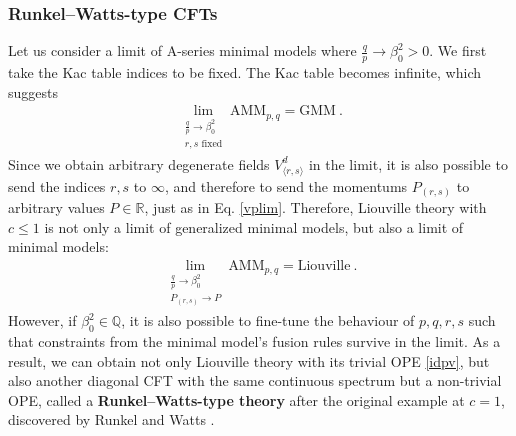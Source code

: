 \documentclass[12pt, a4paper]{article}
\newcommand{\myindex}[1]{\textbf{\boldmath #1}}
\theoremstyle{break}
\begin{document}
\subsubsection{Runkel--Watts-type CFTs}\label{sec:rwt}

Let us consider a limit of A-series minimal models where $\frac{q}{p}\to \beta_0^2>0$. We first take the Kac table indices to be fixed. 
The Kac table becomes infinite, which suggests 
\begin{align}
 \lim_{\substack{\frac{q}{p}\to \beta_0^2\\ r,s\text{ fixed}}} \text{AMM}_{p,q} = \text{GMM}\ . 
 \label{mm-gmm}
\end{align}
Since we obtain arbitrary degenerate fields $V^d_{\langle r,s\rangle}$ in the limit, it is also possible to send the indices $r,s$ to $\infty$, and therefore to send the momentums $P_{(r,s)}$ to arbitrary values $P\in\mathbb{R}$, just as in Eq. \eqref{vplim}. Therefore, Liouville theory with $c\leq 1$ is not only a limit of generalized minimal models, but also a limit of minimal models:
\begin{align}
 \lim_{\substack{\frac{q}{p}\to \beta_0^2\\ P_{(r,s)}\to P}} \text{AMM}_{p,q} = \text{Liouville}\ . 
 \label{mm-liou}
\end{align}
However, if $\beta_0^2\in\mathbb{Q}$, it is also possible to fine-tune the behaviour of $p,q,r,s$ such that constraints from the minimal model's fusion rules survive in the limit. As a result, we can obtain not only Liouville theory with its trivial OPE \eqref{idpv}, but also another diagonal CFT with the same continuous spectrum but a non-trivial OPE, called a \myindex{Runkel--Watts-type theory} after the original example at $c=1$, discovered by Runkel and Watts \cite{rw01}. 
\end{document}
